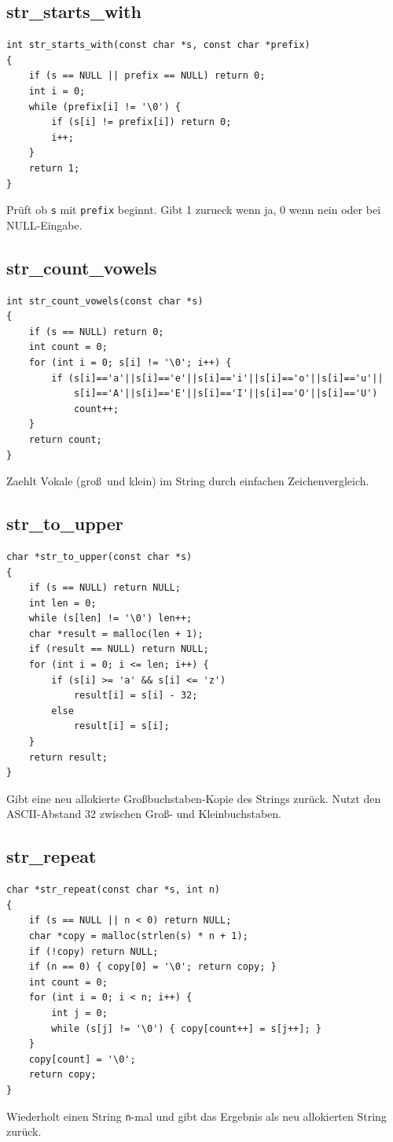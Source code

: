 \documentclass[10pt, a4paper]{article}
\begin{document}
\subsection{str\_starts\_with}
\begin{lstlisting}
int str_starts_with(const char *s, const char *prefix)
{
    if (s == NULL || prefix == NULL) return 0;
    int i = 0;
    while (prefix[i] != '\0') {
        if (s[i] != prefix[i]) return 0;
        i++;
    }
    return 1;
}
\end{lstlisting}
Pr\"uft ob \texttt{s} mit \texttt{prefix} beginnt. Gibt 1 zurueck wenn ja, 0 wenn nein oder bei NULL-Eingabe.

\subsection{str\_count\_vowels}
\begin{lstlisting}
int str_count_vowels(const char *s)
{
    if (s == NULL) return 0;
    int count = 0;
    for (int i = 0; s[i] != '\0'; i++) {
        if (s[i]=='a'||s[i]=='e'||s[i]=='i'||s[i]=='o'||s[i]=='u'||
            s[i]=='A'||s[i]=='E'||s[i]=='I'||s[i]=='O'||s[i]=='U')
            count++;
    }
    return count;
}
\end{lstlisting}
Zaehlt Vokale (gro\ss\ und klein) im String durch einfachen Zeichenvergleich.

\subsection{str\_to\_upper}
\begin{lstlisting}
char *str_to_upper(const char *s)
{
    if (s == NULL) return NULL;
    int len = 0;
    while (s[len] != '\0') len++;
    char *result = malloc(len + 1);
    if (result == NULL) return NULL;
    for (int i = 0; i <= len; i++) {
        if (s[i] >= 'a' && s[i] <= 'z')
            result[i] = s[i] - 32;
        else
            result[i] = s[i];
    }
    return result;
}
\end{lstlisting}
Gibt eine neu allokierte Gro\ss buchstaben-Kopie des Strings zur\"uck. Nutzt den ASCII-Abstand 32 zwischen Gro\ss - und Kleinbuchstaben.

\subsection{str\_repeat}
\begin{lstlisting}
char *str_repeat(const char *s, int n)
{
    if (s == NULL || n < 0) return NULL;
    char *copy = malloc(strlen(s) * n + 1);
    if (!copy) return NULL;
    if (n == 0) { copy[0] = '\0'; return copy; }
    int count = 0;
    for (int i = 0; i < n; i++) {
        int j = 0;
        while (s[j] != '\0') { copy[count++] = s[j++]; }
    }
    copy[count] = '\0';
    return copy;
}
\end{lstlisting}
Wiederholt einen String \texttt{n}-mal und gibt das Ergebnis als neu allokierten String zur\"uck.
\end{document}
